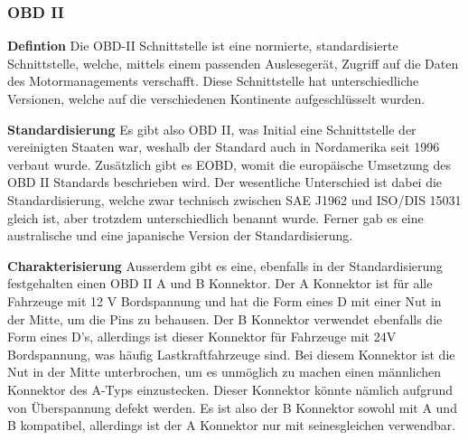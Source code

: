 \subsubsection{OBD II}
\label{subsec:obd2}

\textbf{Defintion\nextline}
Die OBD-II Schnittstelle ist eine normierte, standardisierte Schnittstelle, welche, mittels einem passenden Auslesegerät, Zugriff auf die Daten des Motormanagements verschafft. Diese Schnittstelle hat unterschiedliche Versionen, welche auf die verschiedenen Kontinente aufgeschlüsselt wurden. 

\textbf{Standardisierung\nextline}
Es gibt also OBD II, was Initial eine Schnittstelle der vereinigten Staaten war, weshalb der Standard auch in Nordamerika seit 1996 verbaut wurde. Zusätzlich gibt es EOBD, womit die europäische Umsetzung des OBD II Standards beschrieben wird.\cite{Directive.98/69/EC.EUParliament} Der wesentliche Unterschied ist dabei die Standardisierung, welche zwar technisch zwischen SAE J1962 und ISO/DIS 15031 gleich ist, aber trotzdem unterschiedlich benannt wurde. \cite{SAE.J1962} Ferner gab es eine australische \cite{AU.Motor.Vehicle.Standards.Act.1989} und eine japanische Version der Standardisierung.

\textbf{Charakterisierung\nextline}
Ausserdem gibt es eine, ebenfalls in der Standardisierung festgehalten einen OBD II A und B Konnektor. Der A Konnektor ist für alle Fahrzeuge mit 12 V Bordspannung und hat die Form eines D mit einer Nut in der Mitte, um die Pins zu behausen. Der B Konnektor verwendet ebenfalls die Form eines D's, allerdings ist dieser Konnektor für Fahrzeuge mit 24V Bordspannung, was häufig Lastkraftfahrzeuge sind. Bei diesem Konnektor ist die Nut in der Mitte unterbrochen, um es unmöglich zu machen einen männlichen Konnektor des A-Typs einzustecken. Dieser Konnektor könnte  nämlich aufgrund von Überspannung defekt werden. Es ist also der B Konnektor sowohl mit A und B kompatibel, allerdings ist der A Konnektor nur mit seinesgleichen verwendbar.

